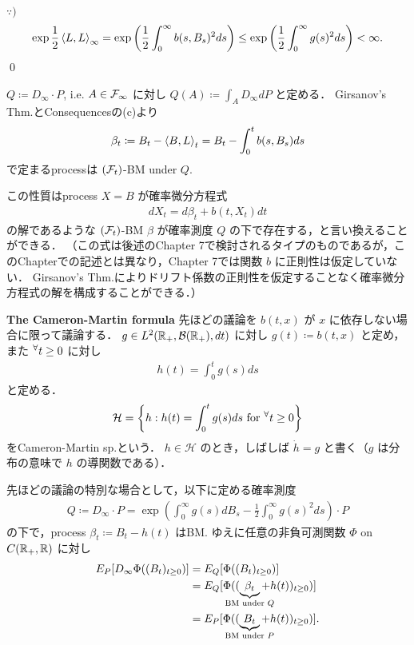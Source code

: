 \documentclass{jsarticle}
\begin{document}
$\because)$
\begin{align}
    \exp\frac{1}{2}\left\langle L,L\right\rangle_\infty
    = \exp\left(\frac{1}{2}\int_0^\infty b(s,B_s)^2 ds\right)
    \le \exp\left(\frac{1}{2}\int_0^\infty g(s)^2 ds\right)
    < \infty.
\end{align}\qed

$Q\coloneqq D_\infty\cdot P$, i.e. $A\in\mathcal{F}_\infty$ に対し $Q(A)\coloneqq\int_A D_\infty dP$ と定める．
Girsanov's Thm.とConsequencesの(c)より
\begin{align}
    \beta_t
    \coloneqq B_t-\left\langle B,L\right\rangle_t
    = B_t-\int_0^t b(s,B_s)ds
\end{align}
で定まるprocessは $(\mathcal{F}_t)$-BM under $Q.$

この性質はprocess $X=B$ が確率微分方程式
\begin{align}
    dX_t=d\beta_t+b(t,X_t)dt
\end{align}
の解であるような $(\mathcal{F}_t)$-BM $\beta$ が確率測度 $Q$ の下で存在する，と言い換えることができる．
（この式は後述のChapter 7で検討されるタイプのものであるが，このChapterでの記述とは異なり，Chapter 7では関数 $b$ に正則性は仮定していない．
Girsanov's Thm.によりドリフト係数の正則性を仮定することなく確率微分方程式の解を構成することができる．）

\textbf{The Cameron-Martin formula}
先ほどの議論を $b(t,x)$ が $x$ に依存しない場合に限って議論する．
$g\in L^2(\mathbb{R}_+,\mathcal{B}(\mathbb{R}_+),dt)$ に対し $g(t)\coloneqq b(t,x)$ と定め，また ${}^{\forall} t\ge0$ に対し
\begin{align}
    h(t)=\int_{0}^{t}g(s)ds
\end{align}
と定める．
\begin{align}
    \mathcal{H}
    = \left\{h:h(t)=\int_{0}^{t}g(s)ds\text{ for }{}^{\forall} t\ge0\right\}
\end{align}
をCameron-Martin sp.という．
$h\in\mathcal{H}$ のとき，しばしば $\dot{h}=g$ と書く（$g$ は分布の意味で $h$ の導関数である）．

先ほどの議論の特別な場合として，以下に定める確率測度
\begin{align}
    Q
    \coloneqq D_\infty\cdot P
    = \exp\left(\int_0^\infty g(s)dB_s-\frac{1}{2}\int_0^\infty g(s)^2 ds\right)\cdot P
\end{align}
の下で，process $\beta_t\coloneqq B_t-h(t)$ はBM.
ゆえに任意の非負可測関数 $\Phi$ on $C(\mathbb{R}_+,\mathbb{R})$ に対し
\begin{align}
    E_P[D_\infty\Phi((B_t)_{t\ge0})]
    &= E_Q[\Phi((B_t)_{t\ge0})] \\
    &= E_Q[\Phi((\UB{\beta_t}{\text{BM under }Q}+h(t))_{t\ge0})] \\
    &= E_P[\Phi((\UB{B_t}{\text{BM under }P}+h(t))_{t\ge0})].
\end{align}
\end{document}
